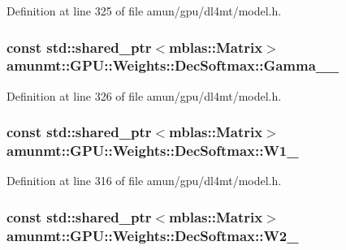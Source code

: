 Definition at line 325 of file amun/gpu/dl4mt/model.\+h.

\subsubsection[{\texorpdfstring{Gamma\+\_\+2\+\_\+}{Gamma_2_}}]{\setlength{\rightskip}{0pt plus 5cm}const std\+::shared\+\_\+ptr$<${\bf mblas\+::\+Matrix}$>$ amunmt\+::\+G\+P\+U\+::\+Weights\+::\+Dec\+Softmax\+::\+Gamma\+\_\+\_\+}\hypertarget{structamunmt_1_1GPU_1_1Weights_1_1DecSoftmax_ad876cf5cc5dd9974c29839baaf1af18f}{}\label{structamunmt_1_1GPU_1_1Weights_1_1DecSoftmax_ad876cf5cc5dd9974c29839baaf1af18f}


Definition at line 326 of file amun/gpu/dl4mt/model.\+h.

\subsubsection[{\texorpdfstring{W1\+\_\+}{W1_}}]{\setlength{\rightskip}{0pt plus 5cm}const std\+::shared\+\_\+ptr$<${\bf mblas\+::\+Matrix}$>$ amunmt\+::\+G\+P\+U\+::\+Weights\+::\+Dec\+Softmax\+::\+W1\+\_\+}\hypertarget{structamunmt_1_1GPU_1_1Weights_1_1DecSoftmax_abb369b3ad25c44af574478b232eb6c9b}{}\label{structamunmt_1_1GPU_1_1Weights_1_1DecSoftmax_abb369b3ad25c44af574478b232eb6c9b}


Definition at line 316 of file amun/gpu/dl4mt/model.\+h.

\subsubsection[{\texorpdfstring{W2\+\_\+}{W2_}}]{\setlength{\rightskip}{0pt plus 5cm}const std\+::shared\+\_\+ptr$<${\bf mblas\+::\+Matrix}$>$ amunmt\+::\+G\+P\+U\+::\+Weights\+::\+Dec\+Softmax\+::\+W2\+\_\+}\hypertarget{structamunmt_1_1GPU_1_1Weights_1_1DecSoftmax_a0ed119030e1d4a42e1cbabc8a5606d18}{}\label{structamunmt_1_1GPU_1_1Weights_1_1DecSoftmax_a0ed119030e1d4a42e1cbabc8a5606d18}


